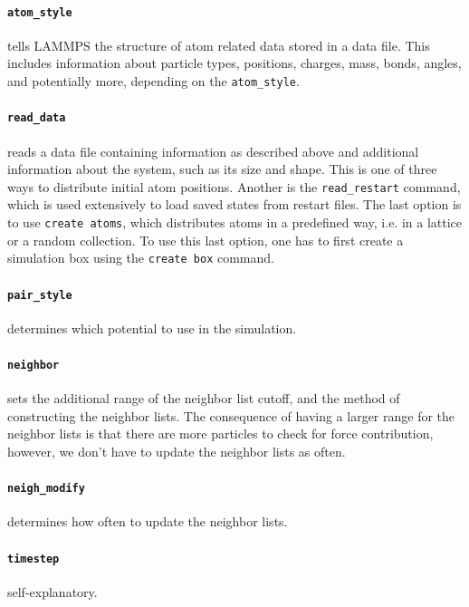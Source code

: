 \documentclass[twoside,english]{uiofysmaster}
\begin{document}
\paragraph{\texttt{atom\_style}} tells LAMMPS the structure of atom related data stored in a data file. This includes information about particle types, positions, charges, mass,  bonds, angles, and potentially more, depending on the \texttt{atom\_style}. 

\paragraph{\texttt{read\_data}} reads a data file containing information as described above and additional information about the system, such as its size and shape. 
This is one of three ways to distribute initial atom positions. 
Another is the \texttt{read\_restart} command, which is used extensively to load saved states from restart files. 
The last option is to use \texttt{create atoms}, which distributes atoms in a predefined way, i.e. in a lattice or a random collection. 
To use this last option, one has to first create a simulation box using the \texttt{create box} command.  

\paragraph{\texttt{pair\_style}} determines which potential to use in the simulation.


\paragraph{\texttt{neighbor}} sets the additional range of the neighbor list cutoff, and the method of constructing the neighbor lists. 
The consequence of having a larger range for the neighbor lists is that there are more particles to check for force contribution, however, we don't have to update the neighbor lists as often.  

\paragraph{\texttt{neigh\_modify}} determines how often to update the neighbor lists. 

\paragraph{\texttt{timestep}} self-explanatory.
\end{document}
